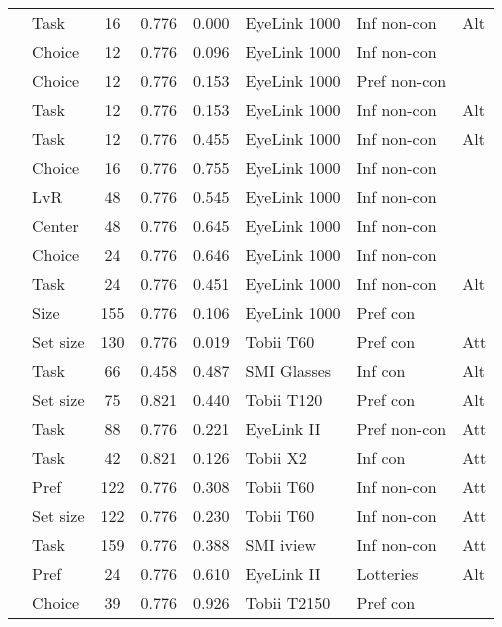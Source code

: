 \begin{longtable}{p{5cm}lccclll}
  \cite{glaholt2009a} & Task & 16 & 0.776 & 0.000 & EyeLink 1000 & Inf non-con & Alt \\ 
  \cite{glaholt2009b} & Choice & 12 & 0.776 & 0.096 & EyeLink 1000 & Inf non-con &  \\ 
  \cite{glaholt2009b} & Choice & 12 & 0.776 & 0.153 & EyeLink 1000 & Pref non-con &  \\ 
  \cite{glaholt2009b} & Task & 12 & 0.776 & 0.153 & EyeLink 1000 & Inf non-con & Alt \\ 
  \cite{glaholt2009b} & Task & 12 & 0.776 & 0.455 & EyeLink 1000 & Inf non-con & Alt \\ 
  \cite{glaholt2009c} & Choice & 16 & 0.776 & 0.755 & EyeLink 1000 & Inf non-con &  \\ 
  \cite{glaholt2010} & LvR & 48 & 0.776 & 0.545 & EyeLink 1000 & Inf non-con &  \\ 
  \cite{glaholt2010} & Center & 48 & 0.776 & 0.645 & EyeLink 1000 & Inf non-con &  \\ 
  \cite{glaholt2012} & Choice & 24 & 0.776 & 0.646 & EyeLink 1000 & Inf non-con &  \\ 
  \cite{glaholt2012} & Task & 24 & 0.776 & 0.451 & EyeLink 1000 & Inf non-con & Alt \\ 
  \cite{graham2016} & Size & 155 & 0.776 & 0.106 & EyeLink 1000 & Pref con &  \\ 
  \cite{grebitus2015} & Set size & 130 & 0.776 & 0.019 & Tobii T60 & Pref con & Att \\ 
  \cite{guyader2017} & Task & 66 & 0.458 & 0.487 & SMI Glasses & Inf con & Alt \\ 
  \cite{hong2016a} & Set size & 75 & 0.821 & 0.440 & Tobii T120 & Pref con & Alt \\ 
  \cite{huang2011} & Task & 88 & 0.776 & 0.221 & EyeLink II & Pref non-con & Att \\ 
  \cite{hwang2017} & Task & 42 & 0.821 & 0.126 & Tobii X2 & Inf con & Att \\ 
  \cite{jenke2019} & Pref & 122 & 0.776 & 0.308 & Tobii T60 & Inf non-con & Att \\ 
  \cite{jenke2019} & Set size & 122 & 0.776 & 0.230 & Tobii T60 & Inf non-con & Att \\ 
  \cite{keller2014} & Task & 159 & 0.776 & 0.388 & SMI iview & Inf non-con & Att \\ 
  \cite{kim2012a} & Pref & 24 & 0.776 & 0.610 & EyeLink II & Lotteries & Alt \\ 
  \cite{krajbich2010a} & Choice & 39 & 0.776 & 0.926 & Tobii T2150 & Pref con &  \\ 

\end{longtable}
